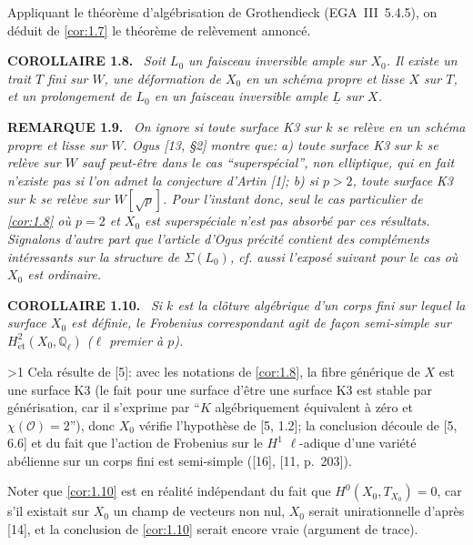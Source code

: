 \documentclass[10pt]{article}
\makeatletter
\newcommand{\UL}{\underline{L}}
\newcommand{\sourceanchor}[2]{\begingroup\def\@currentlabel{#2}\label{#1}\endgroup}
\newenvironment{sourcestatement}[3]{\par\smallskip\noindent\textbf{#1 #2.}\sourceanchor{#3}{#2}\ \itshape}{\par\normalfont\smallskip}
\newcommand{\DPage}[2]{\ifnum#1>1\clearpage\fi\setcounter{page}{#2}}
\makeatother
\begin{document}
Appliquant le théorème d'algébrisation de Grothendieck (EGA~III~5.4.5), on déduit de \ref{cor:1.7} le théorème de relèvement annoncé.

\begin{sourcestatement}{COROLLAIRE}{1.8}{cor:1.8}
Soit $L_0$ un faisceau inversible ample sur $X_0$. Il existe un trait $T$ fini sur $W$, une déformation de $X_0$ en un schéma propre et lisse $X$ sur $T$, et un prolongement de $L_0$ en un faisceau inversible ample $\UL$ sur $X$.
\end{sourcestatement}

\begin{sourcestatement}{REMARQUE}{1.9}{rem:1.9}
On ignore si toute surface K3 sur $k$ se relève en un schéma propre et lisse sur $W$. Ogus [13, §2] montre que: a) toute surface K3 sur $k$ se relève sur $W$ sauf peut-être dans le cas ``superspécial'', non elliptique, qui en fait n'existe pas si l'on admet la conjecture d'Artin [1]; b) si $p > 2$, toute surface K3 sur $k$ se relève sur $W[\sqrt{p}]$. Pour l'instant donc, seul le cas particulier de \ref{cor:1.8} où $p = 2$ et $X_0$ est superspéciale n'est pas absorbé par ces résultats. Signalons d'autre part que l'article d'Ogus précité contient des compléments intéressants sur la structure de $\Sigma(L_0)$, cf. aussi l'exposé suivant pour le cas où $X_0$ est ordinaire.
\end{sourcestatement}

\begin{sourcestatement}{COROLLAIRE}{1.10}{cor:1.10}
Si $k$ est la clôture algébrique d'un corps fini sur lequel la surface $X_0$ est définie, le Frobenius correspondant agit de façon semi-simple sur $H^2_{\mathrm{\acute{e}t}}(X_0, \mathbb{Q}_{\ell})$ ($\ell$ premier à $p$).
\end{sourcestatement}

\DPage{7}{64}
Cela résulte de [5]: avec les notations de \ref{cor:1.8}, la fibre générique de $X$ est une surface K3 (le fait pour une surface d'être une surface K3 est stable par générisation, car il s'exprime par ``$K$ algébriquement équivalent à zéro et $\chi(\mathcal{O}) = 2$''), donc $X_0$ vérifie l'hypothèse de [5, 1.2]; la conclusion découle de [5, 6.6] et du fait que l'action de Frobenius sur le $H^1$ $\ell$-adique d'une variété abélienne sur un corps fini est semi-simple ([16], [11, p.~203]).

Noter que \ref{cor:1.10} est en réalité indépendant du fait que $H^0(X_0, T_{X_0}) = 0$, car s'il existait sur $X_0$ un champ de vecteurs non nul, $X_0$ serait unirationnelle d'après [14], et la conclusion de \ref{cor:1.10} serait encore vraie (argument de trace).
\end{document}
